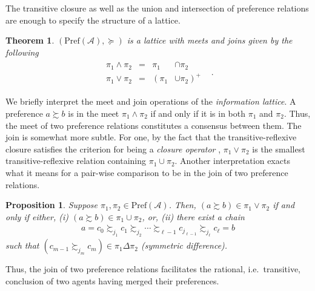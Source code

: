 \documentclass[conference]{ieeeconf}
\newcommand{\A}{\mathcal{A}}
\newcommand{\Pref}{\mathrm{Pref}}
\newcommand{\prefers}{\succsim}
\newcommand{\join}{\vee}
\newcommand{\meet}{\wedge}
\newtheorem{theorem}{Theorem}
\newtheorem{proposition}{Proposition}
\begin{document}
The transitive closure as well as the union and intersection of preference relations are enough to specify the structure of a lattice.

\begin{theorem}
    $(\Pref(\A), \succeq)$ is a lattice with meets and joins given by the following
    \leavevmode
    \begin{align}
    \begin{aligned}
        \pi_1 \meet \pi_2 &=& \pi_1 &\cap \pi_2& \\
 \pi_1 \join \pi_2 &=&  \left(\pi_1  \right. &\left. \cup \pi_2  \right)^{+}
    \end{aligned}. \label{eq:join-meets}
\end{align}
\end{theorem}

We briefly interpret the meet and join operations of the \emph{information lattice}. A preference $a \prefers b$ is in the meet $\pi_1 \meet \pi_2$ if and only if it is in both $\pi_1$ and $\pi_2$. Thus, the meet of two preference relations constitutes a consensus between them. The join is somewhat more subtle. For one, by the fact that the transitive-reflexive closure satisfies the criterion for being a \emph{closure operator} \cite{roman}, $\pi_1 \join \pi_2$ is the smallest transitive-reflexive relation containing $\pi_1 \cup \pi_2$. Another interpretation exacts what it means for a pair-wise comparison to be in the join of two preference relations.
\begin{proposition}
    Suppose $\pi_1, \pi_2 \in \Pref(\A)$. Then, $(a \prefers b) \in \pi_1 \join \pi_2$ if and only if either, (i) $(a \prefers b) \in \pi_1 \cup \pi_2$, or, (ii) there exist a chain
    \begin{align}
        a = c_0 \prefers_{j_1} c_1 \prefers_{j_2}  \cdots \prefers_{\ell-1} c_{j_{\ell-1}} \prefers_{j_\ell} c_{\ell} = b \label{eq:chain}
    \end{align}
    such that $\left( c_{m-1} \prefers_{{j_m}} c_{m} \right) \in \pi_1 \Delta \pi_2$ (symmetric difference).
\end{proposition}

Thus, the join of two preference relations facilitates the rational, i.e.~transitive, conclusion of two agents having merged their preferences.
\end{document}

